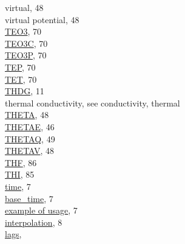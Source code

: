 \documentclass[
]{article}
\begin{document}
\hspace*{0.333em}\hspace*{0.333em}virtual, 48\\
\hspace*{0.333em}\hspace*{0.333em}virtual potential, 48\\
\href{./6-air-chemistry-measurements.html\#te03}{TEO3}, 70\\
\href{./6-air-chemistry-measurements.html\#te03c}{TEO3C}, 70\\
\href{./6-air-chemistry-measurements.html\#tep}{TEO3P}, 70\\
\href{./6-air-chemistry-measurements.html\#tep}{TEP}, 70\\
\href{./6-air-chemistry-measurements.html\#tet}{TET}, 70\\
\href{./3-the-state-of-the-aircraft.html\#thdg}{THDG}, 11\\
thermal conductivity, see conductivity, thermal\\
\href{./4-the-state-of-the-atmosphere.html\#theta}{THETA}, 48\\
\href{./4-the-state-of-the-atmosphere.html\#thetae}{THETAE}, 46\\
\href{./4-the-state-of-the-atmosphere.html\#thetaq}{THETAQ}, 49\\
\href{./4-the-state-of-the-atmosphere.html\#thetav}{THETAV}, 48\\
\href{./10-obsolete-variables.html\#thf}{THF}, 86\\
\href{./10-obsolete-variables.html\#ltn51}{THI}, 85\\
\href{./2-general-information-about-data-files.html\#time}{time}, 7\\
\hspace*{0.333em}\hspace*{0.333em}\href{./2-general-information-about-data-files.html\#base_time}{base\_time},
7\\
\hspace*{0.333em}\hspace*{0.333em}\href{./2-general-information-about-data-files.html\#time}{example
of usage}, 7\\
\hspace*{0.333em}\hspace*{0.333em}\href{./2-general-information-about-data-files.html\#synchronization-of-measurements}{interpolation},
8\\
\hspace*{0.333em}\hspace*{0.333em}\href{./2-general-information-about-data-files.html\#synchronization-of-measurements}{lags},
\end{document}
